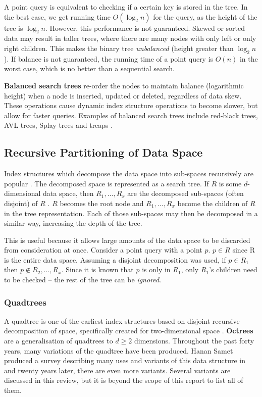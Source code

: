A point query is equivalent to checking if a certain key is stored in the tree. In the best case, we get running time $O(\log_2 n)$ for the query, as the height of the tree is $\log_2 n$. However, this performance is not guaranteed. Skewed or sorted data may result in taller trees, where there are many nodes with only left or only right children. This makes the binary tree \textit{unbalanced} (height greater than $\log_2 n$). If balance is not guaranteed, the running time of a point query is $O(n)$ in the worst case, which is no better than a sequential search.

\textbf{Balanced search trees} re-order the nodes to maintain balance (logarithmic height) when a node is inserted, updated or deleted, regardless of data skew. These operations cause dynamic index structure operations to become slower, but allow for faster queries. Examples of balanced search trees include red-black trees, AVL trees, Splay trees and treaps \cite{introduction-to-algorithms}.

\subsection{Recursive Partitioning of Data Space}
\label{sec:recursive-partition-structures}

Index structures which decompose the data space into sub-spaces recursively are popular \cite{md-structures-samet}. The decomposed space is represented as a search tree. If $R$ is some $d$-dimensional data space, then $R_1,...,R_x$ are the decomposed sub-spaces (often disjoint) of $R$ . $R$ becomes the root node and $R_1,...,R_x$ become the children of $R$ in the tree representation. Each of those sub-spaces may then be decomposed in a similar way, increasing the depth of the tree.

This is useful because it allows large amounts of the data space to be discarded from consideration at once. Consider a point query with a point $p$. $p \in R$ since R is the entire data space. Assuming a disjoint decomposition was used, if $p \in R_1$ then $p \not\in R_2,...,R_x$. Since it is known that $p$ is only in $R_1$, only $R_1$'s children need to be checked -- the rest of the tree can be \textit{ignored}.

\subsubsection{Quadtrees}

A quadtree is one of the earliest index structures based on disjoint recursive decomposition of space, specifically created for two-dimensional space \cite{original-quadtree}. \textbf{Octrees} are a generalisation of quadtrees to $d \geq 2$ dimensions. Throughout the past forty years, many variations of the quadtree have been produced. Hanan Samet produced a survey describing many uses and variants of this data structure in  \cite{quadtree} and twenty years later, there are even more variants. Several variants are discussed in this review, but it is beyond the scope of this report to list all of them.

